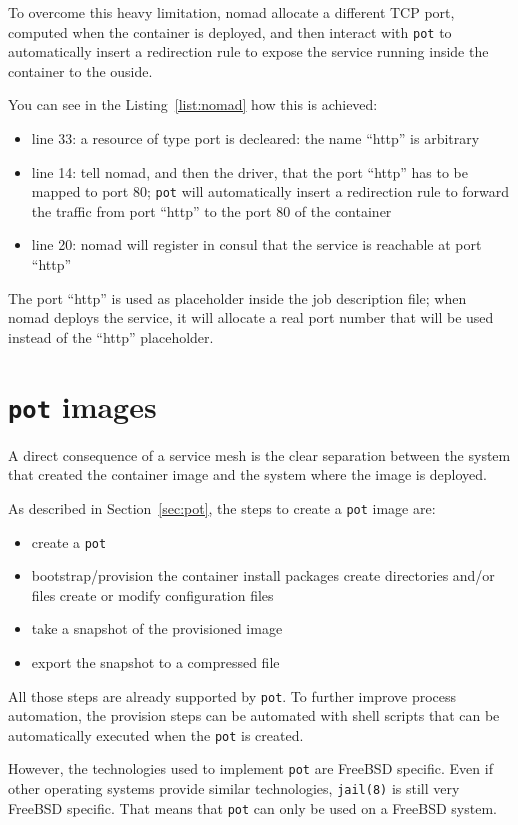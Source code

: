 \documentclass[conference,a4paper,11pt]{IEEEtran}
\begin{document}
To overcome this heavy limitation, nomad allocate a different TCP port, computed when the container is deployed, and then interact with \texttt{pot} to automatically insert a redirection rule to expose the service running inside the container to the ouside.

You can see in the Listing~\ref{list:nomad} how this is achieved:
\begin{itemize}
	\item line 33: a resource of type port is decleared: the name ``http'' is arbitrary
	\item line 14: tell nomad, and then the driver, that the port ``http'' has to be mapped to port 80; \texttt{pot} will automatically insert a redirection rule to forward the traffic from port ``http'' to the port 80 of the container
	\item line 20: nomad will register in consul that the service is reachable at port ``http''
\end{itemize}
The port ``http'' is used as placeholder inside the job description file; when nomad deploys the service, it will allocate a real port number that will be used instead of the ``http'' placeholder.

\section{\texttt{pot} images}\label{sec:Images}
A direct consequence of a service mesh is the clear separation between the system that created the container image and the system where the image is deployed.

As described in Section~\ref{sec:pot}, the steps to create a \texttt{pot} image are:
\begin{itemize}
	\item create a \texttt{pot}
	\item bootstrap/provision the container
		\subitem install packages
		\subitem create directories and/or files
		\subitem create or modify configuration files
	\item take a snapshot of the provisioned image
	\item export the snapshot to a compressed file
\end{itemize}

All those steps are already supported by \texttt{pot}. To further improve process automation, the provision steps can be automated with shell scripts that can be automatically executed when the \texttt{pot} is created.

However, the technologies used to implement \texttt{pot} are FreeBSD specific. Even if other operating systems provide similar technologies, \texttt{jail(8)} is still very FreeBSD specific. That means that \texttt{pot} can only be used on a FreeBSD system.
\end{document}
